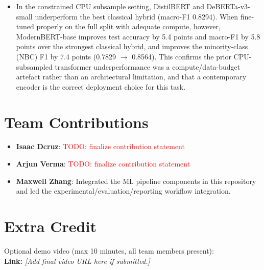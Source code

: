 \documentclass[10pt]{article}
\begin{document}
\begin{itemize}
\begin{itemize}
        \item In the constrained CPU subsample setting, DistilBERT and DeBERTa-v3-small underperform the best classical hybrid (macro-F1 0.8294). When fine-tuned properly on the full split with adequate compute, however, ModernBERT-base improves test accuracy by 5.4 points and macro-F1 by 5.8 points over the strongest classical hybrid, and improves the minority-class (NBC) F1 by 7.4 points (0.7829 $\rightarrow$ 0.8564). This confirms the prior CPU-subsampled transformer underperformance was a compute/data-budget artefact rather than an architectural limitation, and that a contemporary encoder is the correct deployment choice for this task.
    \end{itemize}
\end{itemize}

\section{Team Contributions}
\begin{itemize}
    \item \textbf{Isaac Dcruz}: \textcolor{red}{TODO: finalize contribution statement}
    \item \textbf{Arjun Verma}: \textcolor{red}{TODO: finalize contribution statement}
    \item \textbf{Maxwell Zhang}: Integrated the ML pipeline components in this repository and led the experimental/evaluation/reporting workflow integration.
\end{itemize}

\section{Extra Credit}
Optional demo video (max 10 minutes, all team members present):\\
\textbf{Link:} \emph{[Add final video URL here if submitted.]}
\end{document}
